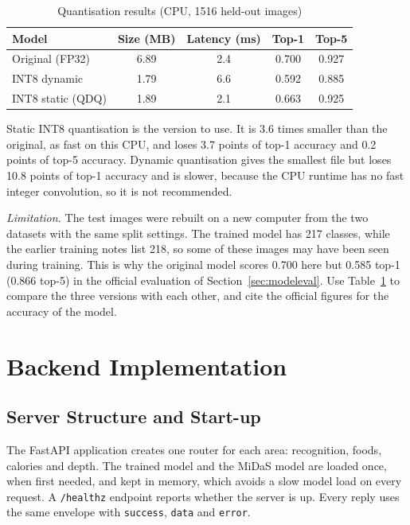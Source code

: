 \begin{table}[H]
\centering
\caption{Quantisation results (CPU, 1516 held-out images)}
\label{tab:quant}
\begin{tabular}{|l|c|c|c|c|}
\hline
\textbf{Model} & \textbf{Size (MB)} & \textbf{Latency (ms)} & \textbf{Top-1} & \textbf{Top-5} \\
\hline
Original (FP32)   & 6.89 & 2.4 & 0.700 & 0.927 \\
INT8 dynamic      & 1.79 & 6.6 & 0.592 & 0.885 \\
INT8 static (QDQ) & 1.89 & 2.1 & 0.663 & 0.925 \\
\hline
\end{tabular}
\end{table}

Static INT8 quantisation is the version to use. It is 3.6 times smaller than the original, as fast on this CPU,
and loses 3.7 points of top-1 accuracy and 0.2 points of top-5 accuracy. Dynamic quantisation gives the
smallest file but loses 10.8 points of top-1 accuracy and is slower, because the CPU runtime has no fast
integer convolution, so it is not recommended.

\textit{Limitation.} The test images were rebuilt on a new computer from the two datasets with the same split
settings. The trained model has 217 classes, while the earlier training notes list 218, so some of these images
may have been seen during training. This is why the original model scores 0.700 here but 0.585 top-1 (0.866
top-5) in the official evaluation of Section~\ref{sec:modeleval}. Use Table~\ref{tab:quant} to compare the three
versions with each other, and cite the official figures for the accuracy of the model.

\section{Backend Implementation}
\subsection{Server Structure and Start-up}
The FastAPI application creates one router for each area: recognition, foods, calories and depth. The
trained model and the MiDaS model are loaded once, when first needed, and kept in memory, which avoids a
slow model load on every request. A \texttt{/healthz} endpoint reports whether the server is up. Every reply
uses the same envelope with \texttt{success}, \texttt{data} and \texttt{error}.


